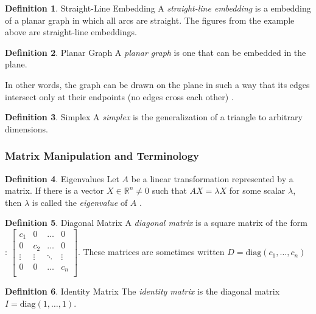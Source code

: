 \documentclass[11pt]{article}
\newcommand{\R}{\mathbb{R}}
\theoremstyle{definition}
\newtheorem{definition}{Definition}[section]
\begin{document}
	\theoremstyle{definition}
	\begin{definition}{Straight-Line Embedding}
		A \emph{straight-line embedding} is a embedding of a planar graph in which all arcs are straight. The figures from the example above are straight-line embeddings.
  	\end{definition}
	
	\theoremstyle{definition}
	\begin{definition}{Planar Graph}
		A \emph{planar graph} is one that can be embedded in the plane.
	\end{definition}
	
	In other words, the graph can be drawn on the plane in such a way that its edges intersect only at their endpoints (no edges cross each other) \cite{mathworld:PlanarGraph}.
	
	\theoremstyle{definition}
	\begin{definition}{Simplex}
		A \emph{simplex} is the generalization of a triangle to arbitrary dimensions.
	\end{definition}

\subsubsection{Matrix Manipulation and Terminology}

	\theoremstyle{definition}
	\begin{definition}{Eigenvalues}
		Let $A$ be a linear transformation represented by a matrix. If there is a vector $X \in \R^n \neq 0$ such that $AX = \lambda X$ for some scalar $\lambda$, then $\lambda$ is called the \emph{eigenvalue} of $A$ \cite{mathworld:Eigenvalue}.
	\end{definition}
	
	\theoremstyle{definition}
	\begin{definition}{Diagonal Matrix}
		A \emph{diagonal matrix} is a square matrix of the form \cite{mathworld:DiagonalMatrix}:
		$\begin{bmatrix}
			c_1 & 0 & \dots & 0 \\
			0 & c_2 & \dots & 0 \\
			\vdots & \vdots  & \ddots  & \vdots \\
			0 & 0 & \dots & c_n \\
		\end{bmatrix}$. These matrices are sometimes written $D = \text{diag}(c_1, \dots, c_n)$
	\end{definition}
	
	\theoremstyle{definition}
	\begin{definition}{Identity Matrix}
		The \emph{identity matrix} is the diagonal matrix $I = \text{diag}(1, \dots, 1)$.
	\end{definition}
	
\end{document}
